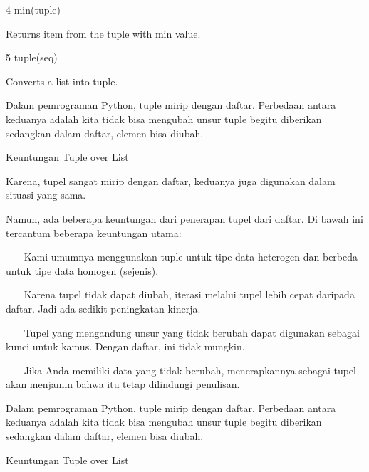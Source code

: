 4 \hspace*{0.5in} min(tuple) \par
\vspace{12pt}
Returns item from the tuple with min value. \par
5 \hspace*{0.5in} tuple(seq) \par
\vspace{12pt}
Converts a list into tuple. \par
\vspace{12pt}
\vspace{12pt}
\vspace{12pt}
\vspace{12pt}
\vspace{12pt}
Dalam pemrograman Python, tuple mirip dengan daftar. Perbedaan antara keduanya adalah kita tidak bisa mengubah unsur tuple begitu diberikan sedangkan dalam daftar, elemen bisa diubah. \par
Keuntungan Tuple over List \par
\vspace{12pt}
Karena, tupel sangat mirip dengan daftar, keduanya juga digunakan dalam situasi yang sama. \par
\vspace{12pt}
Namun, ada beberapa keuntungan dari penerapan tupel dari daftar. Di bawah ini tercantum beberapa keuntungan utama: \par
\vspace{12pt}
~~~ Kami umumnya menggunakan tuple untuk tipe data heterogen dan berbeda untuk tipe data homogen (sejenis). \par
~~~ Karena tupel tidak dapat diubah, iterasi melalui tupel lebih cepat daripada daftar. Jadi ada sedikit peningkatan kinerja. \par
~~~ Tupel yang mengandung unsur yang tidak berubah dapat digunakan sebagai kunci untuk kamus. Dengan daftar, ini tidak mungkin. \par
~~~ Jika Anda memiliki data yang tidak berubah, menerapkannya sebagai tupel akan menjamin bahwa itu tetap dilindungi penulisan. \par
\vspace{12pt}
Dalam pemrograman Python, tuple mirip dengan daftar. Perbedaan antara keduanya adalah kita tidak bisa mengubah unsur tuple begitu diberikan sedangkan dalam daftar, elemen bisa diubah. \par
Keuntungan Tuple over List \par
\vspace{12pt}
